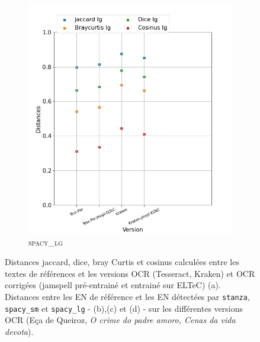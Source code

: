 \begin{figure}[H]
\begin{minipage}{6cm}
\begin{subfigure}{0.89\textwidth}
  \includegraphics[width=.89\textwidth]{IMAGES/ELTeC_DISTANCES_spaCy3.5.1/DE-QUEIROS-CRIME-graph-dist-spaCy3.5.1-lg.png}
   \caption{\textsc{spacy\_lg}}
  \label{fig: }
  \end{subfigure}
  \end{minipage}
\caption{Distances jaccard, dice, bray Curtis et cosinus calculées entre les textes de références et les versions OCR (Tesseract, Kraken) et OCR corrigées (jamspell pré-entrainé et entrainé sur ELTeC) (a). Distances entre les EN de référence et les EN détectées par \texttt{stanza}, \texttt{spacy\_sm} et \texttt{spacy\_lg} - (b),(c) et (d) - sur les différentes versions OCR (Eça de Queiroz, \textit{O crime do padre amoro, Cenas da vida devota}).}
\label{fig:}
\end{figure}

